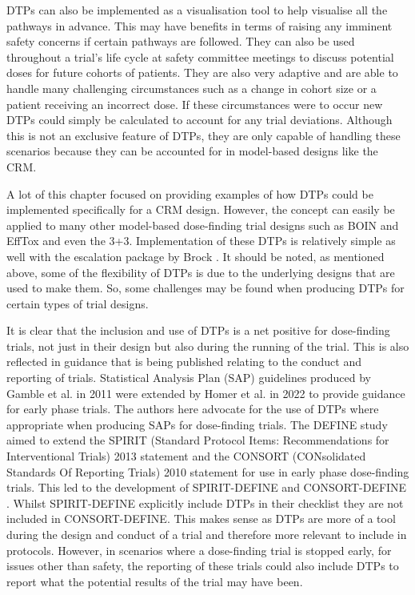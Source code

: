DTPs can also be implemented as a visualisation tool to help visualise all the pathways in advance. This may have benefits in terms of raising any imminent safety concerns if certain pathways are followed. They can also be used throughout a trial's life cycle at safety committee meetings to discuss potential doses for future cohorts of patients. They are also very adaptive and are able to handle many challenging circumstances such as a change in cohort size or a patient receiving an incorrect dose. If these circumstances were to occur new DTPs could simply be calculated to account for any trial deviations. Although this is not an exclusive feature of DTPs, they are only capable of handling these scenarios because they can be accounted for in model-based designs like the CRM. 

A lot of this chapter focused on providing examples of how DTPs could be implemented specifically for a CRM design. However, the concept can easily be applied to many other model-based dose-finding trial designs such as BOIN and EffTox and even the 3+3. Implementation of these DTPs is relatively simple as well with the escalation package by Brock \cite{brockModularApproachDose2020}. It should be noted, as mentioned above, some of the flexibility of DTPs is due to the underlying designs that are used to make them. So, some challenges may be found when producing DTPs for certain types of trial designs. 

It is clear that the inclusion and use of DTPs is a net positive for dose-finding trials, not just in their design but also during the running of the trial. This is also reflected in guidance that is being published relating to the conduct and reporting of trials. Statistical Analysis Plan (SAP) guidelines produced by Gamble et al. \cite{gambleGuidelinesContentStatistical2017} in 2011 were extended by Homer et al. \cite{homerEarlyPhaseClinical2022} in 2022 to provide guidance for early phase trials. The authors here advocate for the use of DTPs where appropriate when producing SAPs for dose-finding trials. The DEFINE study \cite{solovyevaDevelopmentConsensusdrivenSPIRIT2023} aimed to extend the SPIRIT (Standard Protocol Items: Recommendations for Interventional Trials) 2013 statement \cite{chanSPIRIT2013Statement2013} and the CONSORT (CONsolidated Standards Of Reporting Trials) 2010 statement \cite{moherCONSORT2010Explanation2010} for use in early phase dose-finding trials. This led to the development of SPIRIT-DEFINE \cite{yapEnhancingQualityImpact2023} and CONSORT-DEFINE \cite{yapEnhancingReportingQuality2023}. Whilst SPIRIT-DEFINE explicitly include DTPs in their checklist they are not included in CONSORT-DEFINE. This makes sense as DTPs are more of a tool during the design and conduct of a trial and therefore more relevant to include in protocols. However, in scenarios where a dose-finding trial is stopped early, for issues other than safety, the reporting of these trials could also include DTPs to report what the potential results of the trial may have been. 

